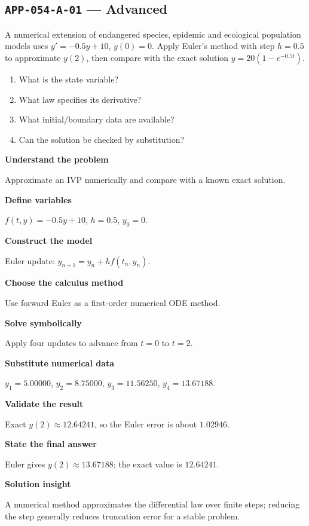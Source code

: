 \documentclass[11pt]{book}
\newcommand{\pid}[1]{\texttt{#1}}
\begin{document}
\subsection*{\pid{APP-054-A-01} — Advanced}
\begin{problembox}
A numerical extension of endangered species, epidemic and ecological population models uses $y'=-0.5y+10$, $y(0)=0$. Apply Euler's method with step $h=0.5$ to approximate $y(2)$, then compare with the exact solution $y=20(1-e^{-0.5t})$.
\end{problembox}
\begin{promptbox}\begin{enumerate}
\item What is the state variable?
\item What law specifies its derivative?
\item What initial/boundary data are available?
\item Can the solution be checked by substitution?
\end{enumerate}\end{promptbox}
\begin{solutionbox}
\textbf{Understand the problem}\par Approximate an IVP numerically and compare with a known exact solution.\par\medskip
\textbf{Define variables}\par $f(t,y)=-0.5y+10$, $h=0.5$, $y_0=0$.\par\medskip
\textbf{Construct the model}\par Euler update: $y_{n+1}=y_n+h f(t_n,y_n)$.\par\medskip
\textbf{Choose the calculus method}\par Use forward Euler as a first-order numerical ODE method.\par\medskip
\textbf{Solve symbolically}\par Apply four updates to advance from $t=0$ to $t=2$.\par\medskip
\textbf{Substitute numerical data}\par $y_1=5.00000$, $y_2=8.75000$, $y_3=11.56250$, $y_4=13.67188$.\par\medskip
\textbf{Validate the result}\par Exact $y(2)\approx 12.64241$, so the Euler error is about $1.02946$.\par\medskip
\textbf{State the final answer}\par Euler gives $y(2)\approx 13.67188$; the exact value is $12.64241$.\par\medskip
\textbf{Solution insight}\par A numerical method approximates the differential law over finite steps; reducing the step generally reduces truncation error for a stable problem.\par\medskip
\end{solutionbox}
\end{document}

